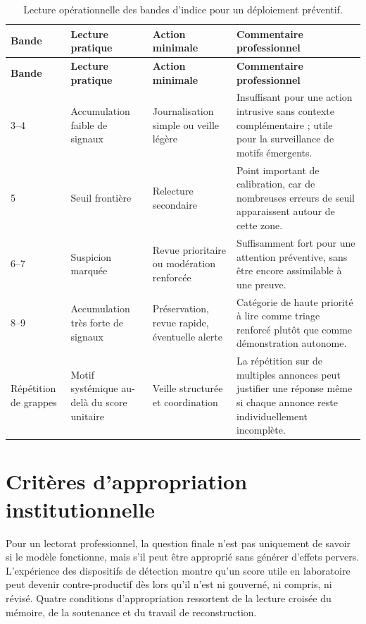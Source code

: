 \documentclass[10pt,a4paper]{article}
\begin{document}
\begin{longtable}{p{2.1cm} p{2.8cm} p{3.7cm} p{6.1cm}}
\caption{Lecture opérationnelle des bandes d'indice pour un déploiement préventif.}\\
\toprule
\textbf{Bande} & \textbf{Lecture pratique} & \textbf{Action minimale} & \textbf{Commentaire professionnel} \\
\midrule
\endfirsthead
\toprule
\textbf{Bande} & \textbf{Lecture pratique} & \textbf{Action minimale} & \textbf{Commentaire professionnel} \\
\midrule
\endhead
3--4 & Accumulation faible de signaux & Journalisation simple ou veille légère & Insuffisant pour une action intrusive sans contexte complémentaire ; utile pour la surveillance de motifs émergents. \\
5 & Seuil frontière & Relecture secondaire & Point important de calibration, car de nombreuses erreurs de seuil apparaissent autour de cette zone. \\
6--7 & Suspicion marquée & Revue prioritaire ou modération renforcée & Suffisamment fort pour une attention préventive, sans être encore assimilable à une preuve. \\
8--9 & Accumulation très forte de signaux & Préservation, revue rapide, éventuelle alerte & Catégorie de haute priorité à lire comme triage renforcé plutôt que comme démonstration autonome. \\
Répétition de grappes & Motif systémique au-delà du score unitaire & Veille structurée et coordination & La répétition sur de multiples annonces peut justifier une réponse même si chaque annonce reste individuellement incomplète. \\
\bottomrule
\end{longtable}

\newpage

\section{Critères d'appropriation institutionnelle}
Pour un lectorat professionnel, la question finale n'est pas uniquement de savoir si le modèle fonctionne, mais s'il peut être approprié sans générer d'effets pervers. L'expérience des dispositifs de détection montre qu'un score utile en laboratoire peut devenir contre-productif dès lors qu'il n'est ni gouverné, ni compris, ni révisé. Quatre conditions d'appropriation ressortent de la lecture croisée du mémoire, de la soutenance et du travail de reconstruction.
\end{document}
